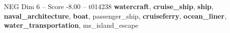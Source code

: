 \begin{textsample}{NEG Dim 6 – Score -8.00 – t014238}  \label{ex:f6_neg_033}
\textbf{watercraft}, \textbf{cruise\_ship}, \textbf{ship}, \textbf{naval\_architecture}, \textbf{boat}, passenger\_ship, \textbf{cruiseferry}, \textbf{ocean\_liner}, \textbf{water\_transportation}, ms\_island\_escape

\end{textsample}
